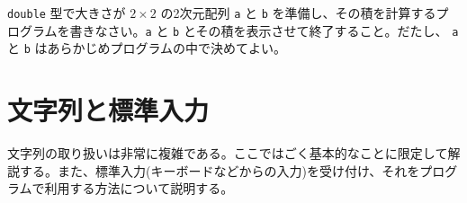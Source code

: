 \begin{renshuu}\label{prob:3-2}
\verb|double| 型で大きさが $2\times2$ の2次元配列 \verb|a| と \verb|b| を準備し、その積を計算するプログラムを書きなさい。\verb|a| と \verb|b| とその積を表示させて終了すること。だたし、 \verb|a| と \verb|b| はあらかじめプログラムの中で決めてよい。
\end{renshuu}

\section{文字列と標準入力}
文字列の取り扱いは非常に複雑である。ここではごく基本的なことに限定して解説する。また、標準入力(キーボードなどからの入力)を受け付け、それをプログラムで利用する方法について説明する。

